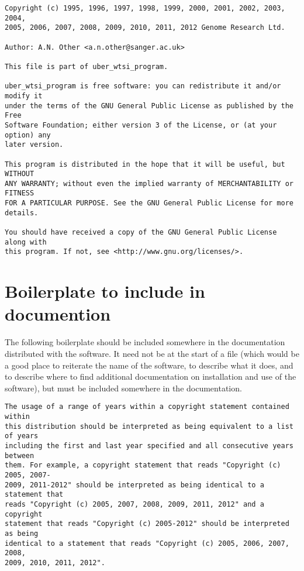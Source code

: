 \documentclass[10pt,a4paper]{article}
\begin{document}
\begin{boilerplate}
\begin{verbatim}
Copyright (c) 1995, 1996, 1997, 1998, 1999, 2000, 2001, 2002, 2003, 2004, 
2005, 2006, 2007, 2008, 2009, 2010, 2011, 2012 Genome Research Ltd. 
 
Author: A.N. Other <a.n.other@sanger.ac.uk> 
 
This file is part of uber_wtsi_program. 
 
uber_wtsi_program is free software: you can redistribute it and/or modify it 
under the terms of the GNU General Public License as published by the Free 
Software Foundation; either version 3 of the License, or (at your option) any 
later version.  

This program is distributed in the hope that it will be useful, but WITHOUT 
ANY WARRANTY; without even the implied warranty of MERCHANTABILITY or FITNESS 
FOR A PARTICULAR PURPOSE. See the GNU General Public License for more 
details. 
 
You should have received a copy of the GNU General Public License along with 
this program. If not, see <http://www.gnu.org/licenses/>. 
\end{verbatim}
\end{boilerplate}


\section{Boilerplate to include in documention}

The following boilerplate should be included somewhere in the 
documentation distributed with the software. It need not be at the start of a 
file (which would be a good place to reiterate the name of the software, to 
describe what it does, and to describe where to find additional documentation 
on installation and use of the software), but must be included somewhere in 
the documentation. 

\begin{boilerplate}
\begin{verbatim}
The usage of a range of years within a copyright statement contained within 
this distribution should be interpreted as being equivalent to a list of years 
including the first and last year specified and all consecutive years between 
them. For example, a copyright statement that reads "Copyright (c) 2005, 2007-
2009, 2011-2012" should be interpreted as being identical to a statement that 
reads "Copyright (c) 2005, 2007, 2008, 2009, 2011, 2012" and a copyright 
statement that reads "Copyright (c) 2005-2012" should be interpreted as being 
identical to a statement that reads "Copyright (c) 2005, 2006, 2007, 2008, 
2009, 2010, 2011, 2012".
\end{verbatim}
\end{boilerplate}
\end{document}
